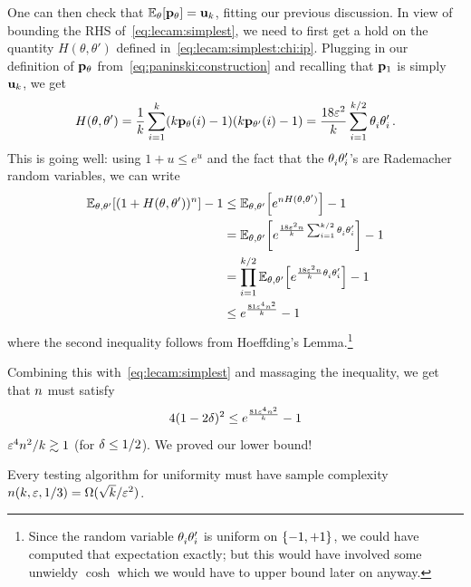 One can then check that
$
	\bE{\theta}{\p_{\theta}} = \uniform_\ab
$, fitting our previous discussion. In view of bounding the RHS of~\cref{eq:lecam:simplest}, we need to first get a hold on the quantity $H(\theta,\theta')$ defined in~\cref{eq:lecam:simplest:chi:ip}. Plugging in our definition of $\mathbf{p}_\theta$ from~\cref{eq:paninski:construction} and recalling that $\mathbf{p}_1$ is simply $\mathbf{u}_k$, we get
\begin{align}
	\label{eq:lecam:simplest:chi:ip:paninski}
H(\theta,\theta') = \frac{1}{k}\sum_{i=1}^k (k\mathbf{p}_\theta(i)-1)(k\mathbf{p}_{\theta'}(i)-1)
= \frac{18\varepsilon^2}{k} \sum_{i=1}^{k/2} \theta^{\vphantom{'}}_i\theta'_i\,.
\end{align}
This is going well: using $1+u \leq e^u$ and the fact that the $\theta^{\vphantom{'}}_i\theta'_i$'s are \iid Rademacher random variables, we can write
\begin{align}
\bE{\theta,\theta'}{(1+{H(\theta,\theta')})^\ns} - 1
&\leq \bE{\theta,\theta'}{e^{\ns H(\theta,\theta')}} - 1 \notag\\
&= \bE{\theta,\theta'}{e^{\frac{18\dst^2\ns}{\ab} \sum_{i=1}^{\ab/2} \theta^{\vphantom{'}}_i\theta'_i}} - 1 \notag\\
&= \prod_{i=1}^{\ab/2} \bE{\theta,\theta'}{e^{\frac{18\dst^2\ns}{\ab} \theta^{\vphantom{'}}_i\theta'_i}} - 1 \notag\\
&\leq e^{\frac{81\dst^4\ns^2}{\ab}} - 1 \label{eq:bound:ingster:mgf:uniformity}
\end{align}
where the second inequality follows from Hoeffding's Lemma.\footnote{Since the random variable $\theta^{\vphantom{'}}_i\theta'_i$ is uniform on $\{-1,+1\}$, we could have computed that expectation exactly; but this would have involved some unwieldy $\cosh$ which we would have to upper bound later on anyway.}

Combining this with~\cref{eq:lecam:simplest} and massaging the inequality, we get that $n$ must satisfy
\begin{equation}
\label{eq:uniformity:lb:ingster:inequality}
	4(1-2\delta)^2 \leq e^{\frac{81\varepsilon^4n^2}{k}} - 1
\end{equation}
\ie $\varepsilon^4n^2/k \gtrsim 1$ (for $\delta \leq 1/2$). We proved our lower bound! 
\begin{theorem}
  \label{theo:uniformity:lb:ingster}
Every testing algorithm for uniformity must have sample complexity $n(k,\varepsilon,1/3) = \Omega(\sqrt{k}/\varepsilon^2)$.
\end{theorem}


